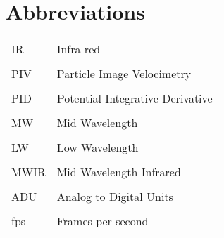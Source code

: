 
\chapter*{Abbreviations}



\begin{tabular}{ll}
IR   & Infra-red                        \\
\\
PIV  & Particle Image Velocimetry       \\
\\
PID  & Potential-Integrative-Derivative \\
\\
MW   & Mid Wavelength                   \\
\\
LW   & Low Wavelength                   \\
\\
MWIR & Mid Wavelength Infrared          \\
\\
ADU  & Analog to Digital Units     \\
\\
fps  & Frames per second     
\end{tabular}

\clearpage
\thispagestyle{empty}
\cleardoublepage




